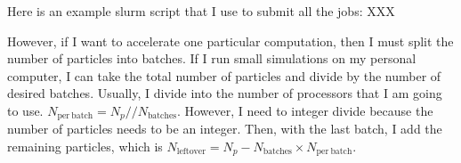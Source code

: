            Here is an example slurm script that I use to submit all the jobs: XXX
            
            However, if I want to accelerate one particular computation, then I must split the number of particles into batches. If I run small simulations on my personal computer, I can take the total number of particles and divide by the number of desired batches. Usually, I divide into the number of processors that I am going to use. $N_\mathrm{per~batch}=N_p//N_\mathrm{batches}$. However, I need to integer divide because the number of particles needs to be an integer. Then, with the last batch, I add the remaining particles, which is $N_\mathrm{left over} = N_p - N_\mathrm{batches} \times N_\mathrm{per~batch}$. 



